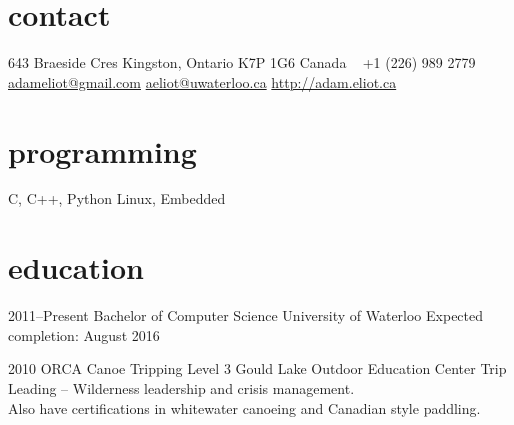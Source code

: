 \documentclass[]{eliot-cv} %
\begin{document}


\begin{aside} %
\section{contact}
643 Braeside Cres
Kingston, Ontario 
K7P 1G6
Canada
~
+1 (226) 989 2779
~
\href{mailto:adameliot@gmail.com}{adameliot@gmail.com}
\href{mailto:aeliot@uwaterloo.ca}{aeliot@uwaterloo.ca}
\href{http://adam.eliot.ca}{http://adam.eliot.ca}
\section{programming}
C, C++, Python
Linux, Embedded
\end{aside}


\section{education}

\begin{entrylist}
\entry
{2011--Present}
{Bachelor {\normalfont of Computer Science}}
{University of Waterloo}
{Expected completion: August 2016\\}

\entry
{2010}
{ORCA {\normalfont Canoe Tripping Level 3}}
{Gould Lake Outdoor Education Center}
{Trip Leading -- Wilderness leadership and crisis management. \\
Also have certifications in whitewater canoeing and Canadian style paddling.}

\end{entrylist}

\end{document}
